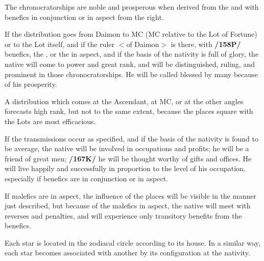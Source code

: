The chronocratorships are noble and prosperous when derived from the \Sun\xspace and \Moon\xspace with benefics in
conjunction or in aspect from the right.

If the distribution goes from Daimon to MC (MC relative to the Lot of Fortune) or to the Lot itself, and if the ruler $<$of Daimon$>$ is there, with \textbf{/158P/} benefics, the \Sun, or the \Moon in aspect, and if the basis of the nativity is full of glory, the native will come to power and great rank, and will be distinguished, ruling, and prominent in those chronocratorships. He will be called blessed by many because of his prosperity. 

A distribution which comes at the Ascendant, at MC, or at the other angles forecasts high rank, but not to the same extent, because the places square with the Lots are most efficacious.

If the transmissions occur as specified, and if the basis of the nativity is found to be average, the native will be involved in occupations and profits; he will be a friend of great men; \textbf{/167K/} he will be thought worthy of gifts and offices. He will live happily and successfully in proportion to the level of his occupation, especially if benefics are in conjunction or in aspect. 

If malefics are in aspect, the influence of the places will be visible in the manner just described, but because of the malefics in aspect, the native will meet with reverses and penalties, and will experience only transitory benefits from the benefics.

Each star is located in the zodiacal circle according to its house. In a similar way, each star becomes associated with another by its configuration at the nativity.

\newpage